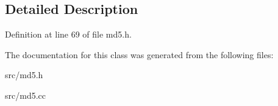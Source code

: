 \subsection{Detailed Description}


Definition at line 69 of file md5.\-h.



The documentation for this class was generated from the following files\-:\begin{DoxyCompactItemize}
\item 
src/md5.\-h\item 
src/md5.\-cc\end{DoxyCompactItemize}

